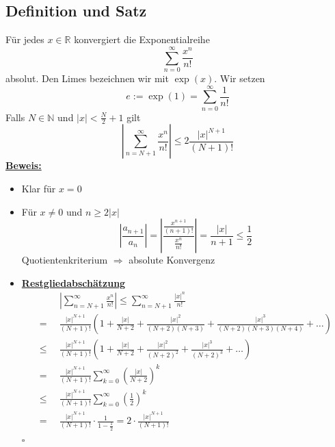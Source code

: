 \subsection{Definition und Satz} %
\label{sub:definition_und_satz}
Für jedes $x \in \mathds{R}$ konvergiert die Exponentialreihe 
\[
	\boxed{ \sum\limits_{n=0}^{\infty} \frac{x^n}{n!}}
\]
absolut. Den Limes bezeichnen wir mit $\exp (x)$. Wir setzen
\[
	e:= \exp(1) = \sum\limits_{n=0}^{\infty} \frac{1}{n!}
\]
Falls $N \in \mathds{N}$ und $|x| < \frac{N}{2} +1$ gilt 
\[
	\left| \sum\limits_{n=N+1}^{\infty}  \frac{x^n}{n!} \right| \le 2 \frac{|x|^{N+1}}{(N+1)!} 
\]
\underline{\textbf{Beweis:}} \\
\begin{itemize}
	\item Klar für $x=0$
	\item Für $x \not= 0$ und $ n\ge 2 |x|$
	\[
		\left| \frac{a_{n+1}}{a_n} \right| = \left| \frac{\frac{x^{n+1}}{(n+1)!}}{\frac{x^n}{n!}} \right| 
		= \frac{|x|}{n+1} \le \frac{1}{2}
	\]
	Quotientenkriterium $\Rightarrow$ absolute Konvergenz
	\item \textbf{\underline{Restgliedabschätzung}}
	\begin{align*}
		&\left| \sum\limits_{n=N+1}^{\infty} \frac{x^n}{n!}\right| \le \sum\limits_{n=N+1}^{\infty} \frac{|x|^n}{n!} \\
		= \enspace& \frac{|x|^{N+1}}{(N+1)!} \left( 1+ \frac{|x|}{N+2} + \frac{|x|^2}{(N+2)(N+3)} 
		+ \frac{|x|^3}{(N+2)(N+3)(N+4)} + \ldots  \right) \\
		\le \enspace & \frac{|x|^{N+1}}{(N+1)!} \left( 1+ \frac{|x|}{N+2} + \frac{|x|^2}{(N+2)^2} 
		+ \frac{|x|^3}{(N+2)^3} + \ldots \right)\\
		= \enspace &  \frac{|x|^{N+1}}{(N+1)!} \sum\limits_{k=0}^{\infty} \left(\frac{|x|}{N+2}\right)^k \\
		\le \enspace & \frac{|x|^{N+1}}{(N+1)!} \sum\limits_{k=0}^{\infty} \left(\frac{1}{2}\right)^k \tag{geometrische Reihe}\\
		= \enspace &  \frac{|x|^{N+1}}{(N+1)!} \cdot \frac{1}{1- \frac{1}{2}} = 2 \cdot \frac{|x|^{N+1}}{(N+1)!}
	\end{align*}
	\hfill \( \square \)
\end{itemize}

